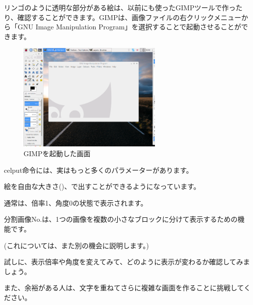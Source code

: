 リンゴのように透明な部分がある絵は、以前にも使ったGIMPツールで作ったり、確認することができます。GIMPは、画像ファイルの右クリックメニューから「GNU Image Manipulation Program」を選択することで起動させることができます。

\begin{figure}[H]
    \begin{center}
      \includegraphics[keepaspectratio,width=7.091cm,height=5.318cm]{text04-img/s_gimpboot.png}
      \caption{GIMPを起動した画面}
    \end{center}
    \label{fig:prog_menu}
\end{figure}

celput命令には、実はもっと多くのパラメーターがあります。



\begin{description}
    \item {}
\end{description}



\begin{description}
    \item {}
    \item {}
    \item {}
\end{description}

絵を自由な大きさ()、で出すことができるようになっています。

通常は、倍率1、角度0の状態で表示されます。

分割画像No.は、1つの画像を複数の小さなブロックに分けて表示するための機能です。

(これについては、また別の機会に説明します。)

試しに、表示倍率や角度を変えてみて、どのように表示が変わるか確認してみましょう。

また、余裕がある人は、文字を重ねてさらに複雑な画面を作ることに挑戦してください。








